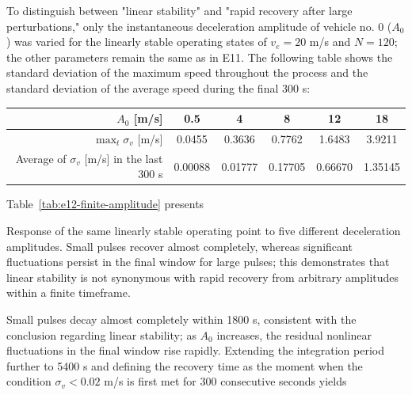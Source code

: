\documentclass[11pt,a4paper,openany]{book}
\numberwithin{equation}{chapter}
\numberwithin{figure}{chapter}
\numberwithin{table}{chapter}
\newcommand{\tabletext}[2]{%
  \par\smallskip\noindent
  Table~\ref{#1} presents #2
\par\smallskip
}
\begin{document}
To distinguish between "linear stability" and "rapid recovery after large perturbations," only the instantaneous deceleration amplitude of vehicle no. 0 ($A_0$) was varied for the linearly stable operating states of $v_e=20$ m/s and $N=120$; the other parameters remain the same as in E11. The following table shows the standard deviation of the maximum speed throughout the process and the standard deviation of the average speed during the final 300 s:









\begin{center}
\small
{}
\label{tab:e12-finite-amplitude}
\begin{tabular}{rccccc}
\toprule
$A_0$ [m/s] & 0.5 & 4 & 8 & 12 & 18 \\
\midrule
$\max_t\sigma_v$ [m/s] & 0.0455 & 0.3636 & 0.7762 & 1.6483 & 3.9211 \\









Average of $\sigma_v$ [m/s] in the last 300 s

& 0.00088 & 0.01777 & 0.17705 & 0.66670 & 1.35145 \\
\bottomrule
\end{tabular}
\end{center}
\tabletext{tab:e12-finite-amplitude}{

Response of the same linearly stable operating point to five different deceleration amplitudes. Small pulses recover almost completely, whereas significant fluctuations persist in the final window for large pulses; this demonstrates that linear stability is not synonymous with rapid recovery from arbitrary amplitudes within a finite timeframe.


}












Small pulses decay almost completely within 1800 s, consistent with the conclusion regarding linear stability; as $A_0$ increases, the residual nonlinear fluctuations in the final window rise rapidly. Extending the integration period further to 5400 s and defining the recovery time as the moment when the condition $\sigma_v<0.02$ m/s is first met for 300 consecutive seconds yields
\end{document}
